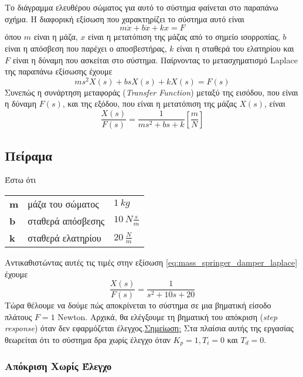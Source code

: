 Το διάγραμμα ελευθέρου σώματος για αυτό το σύστημα φαίνεται στο παραπάνω σχήμα. H διαφορική εξίσωση που χαρακτηρίζει το σύστημα αυτό είναι
\begin{equation}
m\ddot{x} + b\dot{x} + kx = F
\label{eq:mass_springer_damper_ode}
\end{equation}
όπου $m$ είναι η μάζα, $x$ είναι η μετατόπιση της μάζας από το σημείο ισορροπίας, $b$ είναι η απόσβεση που παρέχει ο αποσβεστήρας, $k$ είναι η σταθερά του ελατηρίου και $F$ είναι η δύναμη που ασκείται στο σύστημα. Παίρνοντας το μετασχηματισμό Laplace της παραπάνω εξίσωσης έχουμε
\begin{equation}
ms^2X(s) + bsX(s) + kX(s) = F(s)
\label{eq:mass_springer_damper_laplace}
\end{equation}
Συνεπώς η συνάρτηση μεταφοράς (\emph{Transfer Function}) μεταξύ της εισόδου, που είναι η δύναμη $F(s)$, και της εξόδου, που είναι η μετατόπιση της μάζας $X(s)$, είναι
\begin{equation}
\frac{X(s)}{F(s)} = \frac{1}{ms^2 + bs + k} \left[\frac{m}{N}\right]
\end{equation}

\subsection{Πείραμα}
\noindent
Έστω ότι 
\begin{flushleft}
\begin{tabular}{lll}
\textbf{m} & μάζα του σώματος & $1\ kg$ \\ 
\textbf{b} & σταθερά απόσβεσης & $10\ N\frac{s}{m}$ \\ 
\textbf{k} & σταθερά ελατηρίου & $20\ \frac{N}{m}$ \\ 
\end{tabular} 
\end{flushleft}
Αντικαθιστώντας αυτές τις τιμές στην εξίσωση \ref{eq:mass_springer_damper_laplace} έχουμε
\begin{equation}
\frac{X(s)}{F(s)} = \frac{1}{s^2 + 10s + 20}
\end{equation}
Τώρα θέλουμε να δούμε πώς αποκρίνεται το σύστημα σε μια βηματική είσοδο πλάτους $F=1$ Newton. Αρχικά, θα ελέγξουμε τη βηματική του απόκριση (\emph{step response}) όταν δεν εφαρμόζεται έλεγχος.\newline \underline{Σημείωση:} Στα πλαίσια αυτής της εργασίας θεωρείται ότι το σύστημα δρα χωρίς έλεγχο όταν $K_p = 1, T_i = 0$ και $T_d = 0$.

\subsubsection{Απόκριση Χωρίς Έλεγχο}

